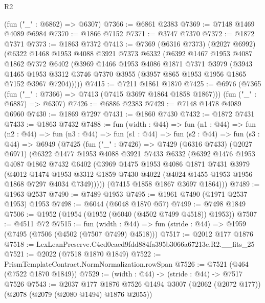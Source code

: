 \begin{lexlean}{R2}
\begin{coremodule}
    (fun ("_" : @6862) => @6307)
@7366 := @6861 @2383
@7369 := @7148 @1469 @4089 @6984
@7370 := @1866 @7152
@7371 := @3747 @7370
@7372 := @1872 @7371
@7373 := @1863 @7372
@7413 := @7369
    (@6316 @7373)
    (@2027 @6992)
    (@6322
      @1468
      @1953
      @4088
      @3921
      @7373
      @6332
      (@6392
        @1467
        @1953
        @4087
        @1862
        @7372
        @6402
        (@3969
          @1466
          @1953
          @4086
          @1871
          @7371
          @3979
          (@3943
            @1465
            @1953
            @3312
            @3746
            @7370
            @3955
            (@3957 @865 @1953 @1956 @1865 @7152 @3967 @7204)))))
@7415 := @7211 @1861 @1870
@7425 := @6976
    (@7365 (fun ("_" : @7366) => @7413 (@7415 @3697 @1864 @1858 @1867)))
    (fun ("_" : @6887) => @6307)
@7426 := @6886 @2383
@7429 := @7148 @1478 @4089 @6960
@7430 := @1869 @7297
@7431 := @1860 @7430
@7432 := @1872 @7431
@7433 := @1863 @7432
@7488 := fun (width : @44) =>
  fun (n1 : @44) =>
  fun (n2 : @44) =>
  fun (n3 : @44) =>
  fun (s1 : @44) =>
  fun (s2 : @44) =>
  fun (s3 : @44) =>
  @6949
    (@7425
      (fun ("_" : @7426) =>
      @7429
        (@6316 @7433)
        (@2027 @6971)
        (@6322
          @1477
          @1953
          @4088
          @3921
          @7433
          @6332
          (@6392
            @1476
            @1953
            @4087
            @1862
            @7432
            @6402
            (@3969
              @1475
              @1953
              @4086
              @1871
              @7431
              @3979
              (@4012
                @1474
                @1953
                @3312
                @1859
                @7430
                @4022
                (@4024 @1455 @1953 @1956 @1868 @7297 @4034 @7349)))))
        (@7415 @1858 @1867 @3697 @1864)))
@7489 := @1963 @2537
@7490 := @7489 @1953
@7495 := @1961 @7490 (@1971 @2537 @1953) @1953
@7498 := @6044 (@6048 @1870 @57)
@7499 := @7498 @1849
@7506 := @1952 (@1954 (@1952 (@6040 (@4502 @7499 @4518)) @1953))
@7507 := @4511 @72
@7515 := fun (width : @44) =>
  fun (stride : @44) => @1959 (@7495 (@7506 (@4502 (@7507 @7499) @4518)))
@7517 := @2012 @177 @1876
@7518 := LexLeanPreserve.C4cd0caed9fdd884fa395b3066a67213e.R2.__fits_25
@7521 := @2022 (@7518 @1870 @1849)
@7522 := PrismTemplateContract.NormNormalization.rowSpan
@7526 := @7521 (@464 (@7522 @1870 @1849))
@7529 := (width : @44) -> (stride : @44) -> @7517 @7526
@7543 := @2037
    @177
    @1876
    @7526
    @1494
    @3007
    (@2062 (@2072 @177))
    (@2078 (@2079 (@2080 @1494) @1876 @2055))

\end{coremodule}
\end{lexlean}
